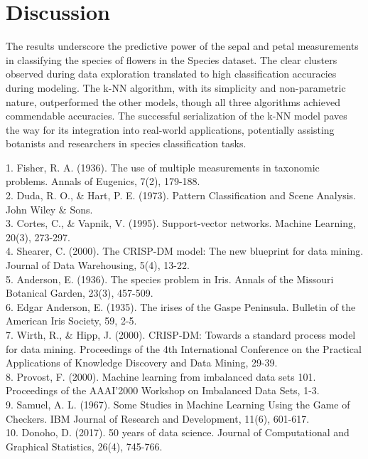 \documentclass{article}
\begin{document}
\begin{itemize}
\end{itemize}

\section*{Discussion}

The results underscore the predictive power of the sepal and petal measurements in classifying the species of flowers in the Species dataset. The clear clusters observed during data exploration translated to high classification accuracies during modeling. The k-NN algorithm, with its simplicity and non-parametric nature, outperformed the other models, though all three algorithms achieved commendable accuracies. The successful serialization of the k-NN model paves the way for its integration into real-world applications, potentially assisting botanists and researchers in species classification tasks.



1. Fisher, R. A. (1936). The use of multiple measurements in taxonomic problems. Annals of Eugenics, 7(2), 179-188.\\
2. Duda, R. O., \& Hart, P. E. (1973). Pattern Classification and Scene Analysis. John Wiley \& Sons.\\
3. Cortes, C., \& Vapnik, V. (1995). Support-vector networks. Machine Learning, 20(3), 273-297.\\
4. Shearer, C. (2000). The CRISP-DM model: The new blueprint for data mining. Journal of Data Warehousing, 5(4), 13-22.\\
5. Anderson, E. (1936). The species problem in Iris. Annals of the Missouri Botanical Garden, 23(3), 457-509.\\
6. Edgar Anderson, E. (1935). The irises of the Gaspe Peninsula. Bulletin of the American Iris Society, 59, 2-5.\\
7. Wirth, R., \& Hipp, J. (2000). CRISP-DM: Towards a standard process model for data mining. Proceedings of the 4th International Conference on the Practical Applications of Knowledge Discovery and Data Mining, 29-39.\\
8. Provost, F. (2000). Machine learning from imbalanced data sets 101. Proceedings of the AAAI'2000 Workshop on Imbalanced Data Sets, 1-3.\\
9. Samuel, A. L. (1967). Some Studies in Machine Learning Using the Game of Checkers. IBM Journal of Research and Development, 11(6), 601-617.\\
10. Donoho, D. (2017). 50 years of data science. Journal of Computational and Graphical Statistics, 26(4), 745-766.
\end{document}
